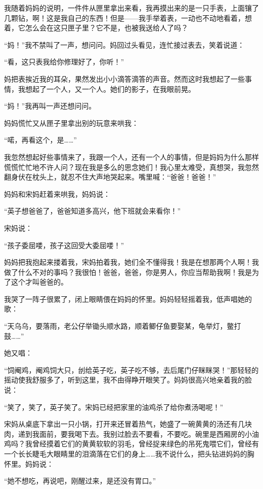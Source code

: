 \par 我随着妈妈的说明，一件件从匣里拿出来看，我再摸出来的是一只手表，上面镶了几颗钻，啊！这是我自己的东西！但是——我手举着表，一动也不动地看着，想着，它怎么会在这只匣子里？它不是，也被我送给人了吗？
\par “妈！”我不禁叫了一声，想问问。妈回过头看见，连忙接过表去，笑着说道：
\par “看，这只表我给你修理好了，你听！”
\par 妈把表挨近我的耳朵，果然发出小小滴答滴答的声音。然而这时我想起了一些事情，我想起了一个人，又一个人。她们的影子，在我眼前晃。
\par “妈！”我再叫一声还想问问。
\par 妈妈慌忙又从匣子里拿出别的玩意来哄我：
\par “喏，再看这个，是……”
\par 我忽然想起好些事情来了，我跟一个人，还有一个人的事情，但是妈妈为什么那样慌慌忙忙地不许人问？现在我是多么的思念她们！我心里太难受，真想哭，我忽然翻身伏在枕头上，就忍不住大声地哭起来。嘴里喊：“爸爸！爸爸！”
\par 妈妈和宋妈赶着来哄我，妈妈说：
\par “英子想爸爸了，爸爸知道多高兴，他下班就会来看你！”
\par 宋妈说：
\par “孩子委屈喽，孩子这回受大委屈喽！”
\par 妈妈把我抱起来搂着我，宋妈拍着我，她们全不懂得我！我是在想那两个人啊！我做了什么不对的事吗？我很怕！爸爸，爸爸，你是男人，你应当帮助我啊！我是为了这个才叫爸爸的。
\par 我哭了一阵子很累了，闭上眼睛偎在妈妈的怀里。妈妈轻轻摇着我，低声唱她的歌：
\par “天乌乌，要落雨，老公仔举锄头顺水路，顺着鲫仔鱼要娶某，龟举灯，鳖打鼓……”
\par 她又唱：
\par “饲阉鸡，阉鸡饲大只，刣给英子吃，英子吃不够，去后尾门仔眯眯哭！”那轻轻的摇动使我舒服多了，听到这里，我不由得睁开眼笑了。妈妈很高兴地亲着我的脸说：
\par “笑了，笑了，英子笑了。宋妈已经把家里的油鸡杀了给你煮汤喝呢！”
\par 宋妈从桌底下拿出一只小锅，打开来还冒着热气，她盛了一碗黄黄的汤还有几块肉，递到我面前，要我喝下去。我别过脸去不要看，不要吃。碗里是西厢房的小油鸡吗？我曾经摸着它们的黄黄软软的羽毛，曾经捉来绿色的吊死鬼喂它们，曾经有一个长长睫毛大眼睛里的泪滴落在它们的身上……我不说什么，把头钻进妈妈的胸怀里。妈妈说：
\par “她不想吃，再说吧，刚醒过来，是还没有胃口。”
